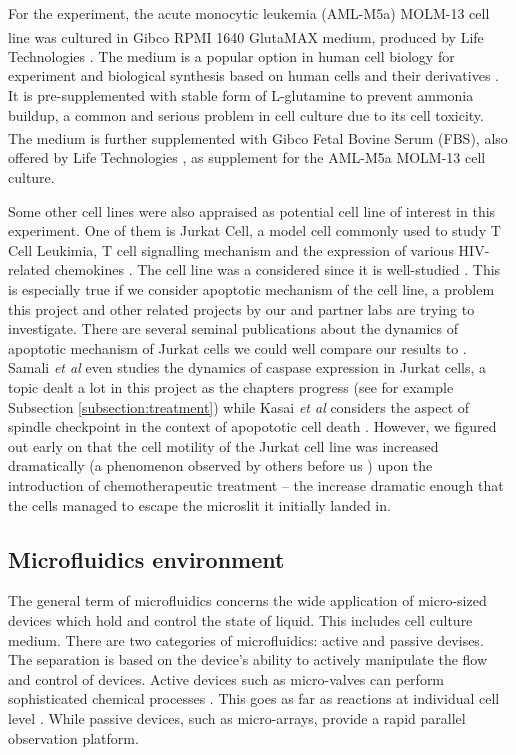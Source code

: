 \documentclass[pdftex,12pt,a4paper]{report}
\begin{document}
For the experiment, the acute monocytic leukemia (AML-M5a) MOLM-13 cell line was cultured in Gibco\textsuperscript{\textregistered} RPMI 1640 GlutaMAX medium, produced by Life Technologies \cite{gibcocellculture2017}. The medium is a popular option in human cell biology for experiment and biological synthesis based on human cells and their derivatives \cite{blight2000efficient, shimizu2002fabrication}. It is pre-supplemented with stable form of L-glutamine to prevent ammonia buildup, a common and serious problem in cell culture due to its cell toxicity\cite{satter1974effect}. The medium is further supplemented with Gibco\textsuperscript{\textregistered} Fetal Bovine Serum (FBS), also offered by Life Technologies \cite{gibcofbs2017}, as supplement for the AML-M5a MOLM-13 cell culture.


Some other cell lines were also appraised as potential cell line of interest in this experiment. One of them is Jurkat Cell, a model cell commonly used to study T Cell Leukimia, T cell signalling mechanism and the expression of various HIV-related chemokines \cite{schneider1977characterization}. The cell line was a considered since it is well-studied \cite{johnson2007genome, schena1996parallel}. This is especially true if we consider apoptotic mechanism of the cell line, a problem this project and other related projects by our  and partner labs are trying to investigate. There are several seminal publications about the dynamics of apoptotic mechanism of Jurkat cells we could well compare our results to \cite{gottlieb1996apoptosis}. Samali \textit{et al} \cite{samali1999presence} even studies the dynamics of caspase expression in Jurkat cells, a topic dealt a lot in this project as the chapters progress (see for example Subsection \ref{subsection:treatment}) while Kasai \textit{et al} considers the aspect of spindle checkpoint in the context of apopototic cell death \cite{kasai2002prevalent}. However, we figured out early on that the cell motility of the Jurkat cell line was increased dramatically (a phenomenon observed by others before us \cite{barnhart2004cd95}) upon the introduction of chemotherapeutic treatment -- the increase dramatic enough that the cells managed to escape the microslit it initially landed in.


\subsection{Microfluidics environment}
\label{subsection:microfluid_env}

The general term of microfluidics concerns the wide application of micro-sized devices which hold and control the state of liquid. This includes cell culture medium. There are two categories of microfluidics: active and passive devises. The separation is based on the device's ability to actively manipulate the flow and control of devices. Active devices such as micro-valves can perform sophisticated chemical processes \cite{marsden1993interdisciplinary}. This goes as far as reactions at individual cell level \cite{eyer2012microchamber}. While passive devices, such as micro-arrays, provide a rapid parallel observation platform.
\end{document}
